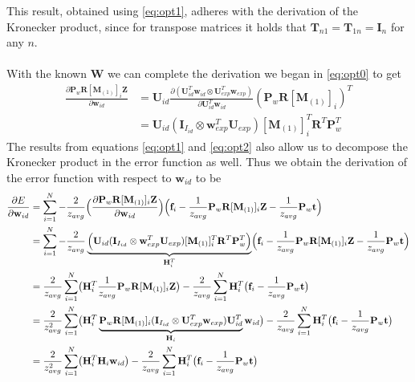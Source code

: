 \documentclass[11pt,a4paper]{report}
\begin{document}
This result, obtained using \ref{eq:opt1}, adheres with the derivation of
the Kronecker product, since for transpose matrices it holds that $\mathbf{T}_{n1} =
\mathbf{T}_{1n} = \mathbf{I}_n$ for any $n$.\\
\\
With the known $\mathbf{W}$ we can complete the derivation we began in \ref{eq:opt0} to get
\begin{align}
\frac
{\partial 
\mathbf{P}_w\mathbf{R}[\mathbf{M}_{(1)}]_{i}\mathbf{Z}
}
{\partial
\mathbf{w}_{id}
}
&=\mathbf{U}_{id}
\frac
{\partial
(\mathbf{U}_{id}^T\mathbf{w}_{id} \otimes \mathbf{U}_{exp}^T\mathbf{w}_{exp})
}
{\partial
\mathbf{U}_{id}^T\mathbf{w}_{id}
}
(\mathbf{P}_w\mathbf{R}[\mathbf{M}_{(1)}]_{i})^T\nonumber\\
&=
\mathbf{U}_{id}
(\mathbf{I}_{I_{id}} \otimes
\mathbf{w}_{exp}^T\mathbf{U}_{exp})
[\mathbf{M}_{(1)}]_{i}^T\mathbf{R}^T\mathbf{P}_w^T
\end{align}
The results from equations \ref{eq:opt1} and \ref{eq:opt2} also allow us to decompose the Kronecker product
in the error function as well. Thus we obtain the derivation of the error function with respect to
$\mathbf{w}_{id}$ to be
\begin{align*}\label{eq:opt4}
\frac{\partial E}{\partial \mathbf{w}_{id}} &= \sum_{i=1}^N -\frac{2}{z_{avg}}\Bigl(
\frac{\partial \mathbf{P}_w\mathbf{R}[\mathbf{M}_{(1)}]_{i}\mathbf{Z}}
{\partial \mathbf{w}_{id}}\Bigr)\Bigl(\mathbf{f}_i - \frac{1}{z_{avg}}\mathbf{P}_w\mathbf{R}[\mathbf{M}_{(1)}]_{i}\mathbf{Z} - \frac{1}{z_{avg}}\mathbf{P}_w\mathbf{t}\Bigr)\\
&=\sum_{i=1}^N -\frac{2}{z_{avg}}\underbrace{\Bigl(\mathbf{U}_{id} (\mathbf{I}_{I_{id}} \otimes \mathbf{w}_{exp}^T\mathbf{U}_{exp}) [\mathbf{M}_{(1)}]_{i}^T\mathbf{R}^T\mathbf{P}_w^T\Bigr)}_{\mathbf{H}_i^T}\Bigl(\mathbf{f}_i - \frac{1}{z_{avg}}\mathbf{P}_w\mathbf{R}[\mathbf{M}_{(1)}]_{i}\mathbf{Z} - \frac{1}{z_{avg}}\mathbf{P}_w\mathbf{t}
\Bigr)\\
&= \frac{2}{z_{avg}}\sum_{i=1}^N\bigl(
\mathbf{H}_i^T\frac{1}{z_{avg}}\mathbf{P}_w\mathbf{R}[\mathbf{M}_{(1)}]_{i}\mathbf{Z}\bigr)
-
\frac{2}{z_{avg}}\sum_{i=1}^N \mathbf{H}_i^T\bigl(\mathbf{f}_i - \frac{1}{z_{avg}}\mathbf{P}_w\mathbf{t}
\bigr)\\
&=
\frac{2}{z_{avg}^2}\sum_{i=1}^N\bigl(
\mathbf{H}_i^T\underbrace{\mathbf{P}_w\mathbf{R}[\mathbf{M}_{(1)}]_{i}(\mathbf{I}_{I_{id}} \otimes \mathbf{U}_{exp}^T\mathbf{w}_{exp})\mathbf{U}_{id}^T}_{\mathbf{H}_i}\mathbf{w}_{id}\bigr)
-
\frac{2}{z_{avg}}\sum_{i=1}^N \mathbf{H}_i^T\bigl(\mathbf{f}_i -
\frac{1}{z_{avg}}\mathbf{P}_w\mathbf{t}\bigr)\\
&=\frac{2}{z_{avg}^2}\sum_{i=1}^N\bigl(
\mathbf{H}_i^T\mathbf{H}_i\mathbf{w}_{id}\bigr)
-
\frac{2}{z_{avg}}\sum_{i=1}^N \mathbf{H}_i^T\bigl(\mathbf{f}_i -
\frac{1}{z_{avg}}\mathbf{P}_w\mathbf{t}\bigr)
\end{align*}
\end{document}
